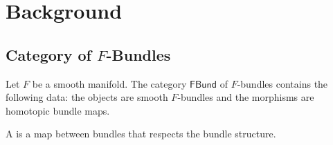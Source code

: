 \documentclass[12pt,class=article,crop=false]{standalone}
\begin{document}
\section{Background}
\subsection{Category of $F$-Bundles}
Let $ F$ be a smooth manifold. The category $ \textsf{FBund} $ of $ F$-bundles contains the following data: the objects are smooth $F $-bundles and the morphisms are homotopic bundle maps.

\begin{defn}
A  is a map between bundles that respects the bundle structure. 
\end{defn}
\begin{remark}

\end{remark}
\end{document}
